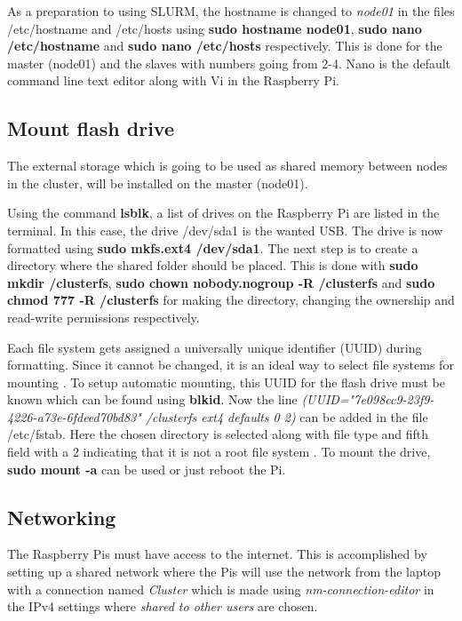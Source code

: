 \documentclass[../Head/Report.tex]{subfiles}
\begin{document}
As a preparation to using SLURM, the hostname is changed to \textit{node01} in the files /etc/hostname and /etc/hosts using \textbf{sudo hostname node01}, \textbf{sudo nano /etc/hostname} and \textbf{sudo nano /etc/hosts} respectively. This is done for the master (node01) and the slaves with numbers going from 2-4. Nano is the default command line text editor along with Vi in the Raspberry Pi. 

\subsection{Mount flash drive}
The external storage which is going to be used as shared memory between nodes in the cluster, will be installed on the master (node01). 

Using the command \textbf{lsblk}, a list of drives on the Raspberry Pi are listed in the terminal. In this case, the drive /dev/sda1 is the wanted USB. The drive is now formatted using \textbf{sudo mkfs.ext4 /dev/sda1}. The next step is to create a directory where the shared folder should be placed. This is done with \textbf{sudo mkdir /clusterfs}, \textbf{sudo chown nobody.nogroup -R /clusterfs} and \textbf{sudo chmod 777 -R /clusterfs} for making the directory, changing the ownership and read-write permissions respectively. 

Each file system gets assigned a universally unique identifier (UUID) during formatting. Since it cannot be changed, it is an ideal way to select file systems for mounting \cite{fstab}. To setup automatic mounting, this UUID for the flash drive must be known which can be found using \textbf{blkid}. Now the line \textit{(UUID="7e098cc9-23f9-4226-a73e-6fdeed70bd83" /clusterfs ext4 defaults 0 2)} can be added in the file /etc/fstab. Here the chosen directory is selected along with file type and fifth field with a 2 indicating that it is not a root file system \cite{fstab_pass}. To mount the drive, \textbf{sudo mount -a} can be used or just reboot the Pi. 

\subsection{Networking}
The Raspberry Pis must have access to the internet. This is accomplished by setting up a shared network where the Pis will use the network from the laptop with a connection named \textit{Cluster} which is made using \textit{nm-connection-editor} in the IPv4 settings where \textit{shared to other users} are chosen. 
\end{document}
